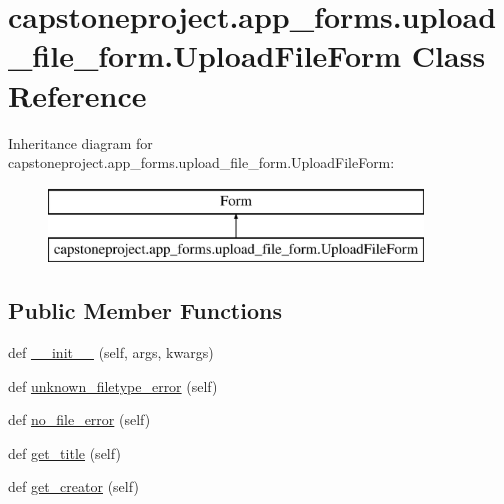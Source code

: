 \hypertarget{classcapstoneproject_1_1app__forms_1_1upload__file__form_1_1_upload_file_form}{}\section{capstoneproject.\+app\+\_\+forms.\+upload\+\_\+file\+\_\+form.\+Upload\+File\+Form Class Reference}
\label{classcapstoneproject_1_1app__forms_1_1upload__file__form_1_1_upload_file_form}
Inheritance diagram for capstoneproject.\+app\+\_\+forms.\+upload\+\_\+file\+\_\+form.\+Upload\+File\+Form\+:\begin{figure}[H]
\begin{center}
\leavevmode
\includegraphics[height=2.000000cm]{classcapstoneproject_1_1app__forms_1_1upload__file__form_1_1_upload_file_form}
\end{center}
\end{figure}
\subsection*{Public Member Functions}
\begin{DoxyCompactItemize}
\item 
def \mbox{\hyperlink{classcapstoneproject_1_1app__forms_1_1upload__file__form_1_1_upload_file_form_a42510cfe304a661a8a5c15fe3da8e8e0}{\+\_\+\+\_\+init\+\_\+\+\_\+}} (self, args, kwargs)
\item 
def \mbox{\hyperlink{classcapstoneproject_1_1app__forms_1_1upload__file__form_1_1_upload_file_form_a694f6985f5b3e83ab3b7eb214d2544c6}{unknown\+\_\+filetype\+\_\+error}} (self)
\item 
def \mbox{\hyperlink{classcapstoneproject_1_1app__forms_1_1upload__file__form_1_1_upload_file_form_af6c4735bbaad4c4de6fc72686f695986}{no\+\_\+file\+\_\+error}} (self)
\item 
def \mbox{\hyperlink{classcapstoneproject_1_1app__forms_1_1upload__file__form_1_1_upload_file_form_aefac55b89cbcc701323f6d5e1deb3a93}{get\+\_\+title}} (self)
\item 
def \mbox{\hyperlink{classcapstoneproject_1_1app__forms_1_1upload__file__form_1_1_upload_file_form_a8d73da0210530745427708acffb55b34}{get\+\_\+creator}} (self)
\end{DoxyCompactItemize}
